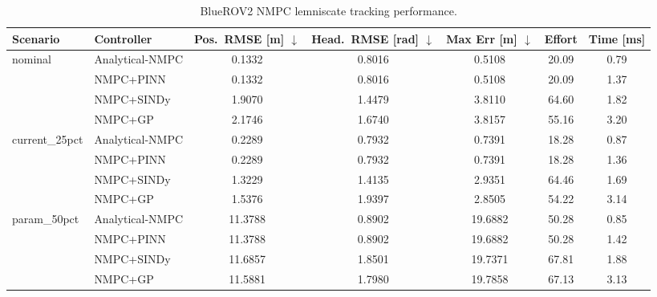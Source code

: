 \begin{table}[htbp]
\centering
\caption{BlueROV2 NMPC lemniscate tracking performance.}
\label{tab:nmpc_summary}
\begin{tabular}{llccccc}
\toprule
Scenario & Controller & Pos.\ RMSE [m] $\downarrow$ & Head.\ RMSE [rad] $\downarrow$ & Max Err [m] $\downarrow$ & Effort & Time [ms] \\
\midrule
nominal & Analytical-NMPC & 0.1332 & 0.8016 & 0.5108 & 20.09 & 0.79 \\
 & NMPC+PINN & 0.1332 & 0.8016 & 0.5108 & 20.09 & 1.37 \\
 & NMPC+SINDy & 1.9070 & 1.4479 & 3.8110 & 64.60 & 1.82 \\
 & NMPC+GP & 2.1746 & 1.6740 & 3.8157 & 55.16 & 3.20 \\
current\_25pct & Analytical-NMPC & 0.2289 & 0.7932 & 0.7391 & 18.28 & 0.87 \\
 & NMPC+PINN & 0.2289 & 0.7932 & 0.7391 & 18.28 & 1.36 \\
 & NMPC+SINDy & 1.3229 & 1.4135 & 2.9351 & 64.46 & 1.69 \\
 & NMPC+GP & 1.5376 & 1.9397 & 2.8505 & 54.22 & 3.14 \\
param\_50pct & Analytical-NMPC & 11.3788 & 0.8902 & 19.6882 & 50.28 & 0.85 \\
 & NMPC+PINN & 11.3788 & 0.8902 & 19.6882 & 50.28 & 1.42 \\
 & NMPC+SINDy & 11.6857 & 1.8501 & 19.7371 & 67.81 & 1.88 \\
 & NMPC+GP & 11.5881 & 1.7980 & 19.7858 & 67.13 & 3.13 \\
\bottomrule
\end{tabular}
\end{table}
